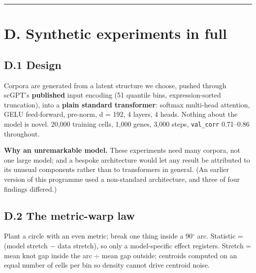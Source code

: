 \begin{center}\rule{0.5\linewidth}{0.5pt}\end{center}

\hypertarget{d.-synthetic-experiments-in-full}{%
\section{D. Synthetic experiments in full}\label{d.-synthetic-experiments-in-full}}

\hypertarget{d.1-design}{%
\subsection{D.1 Design}\label{d.1-design}}

Corpora are generated from a latent structure we choose, pushed through scGPT's \textbf{published} input
encoding (51 quantile bins, expression-sorted truncation), into a \textbf{plain standard transformer}:
softmax multi-head attention, GELU feed-forward, pre-norm, d = 192, 4 layers, 4 heads. Nothing about
the model is novel. 20,000 training cells, 1,000 genes, 3,000 steps, \texttt{val\_corr} 0.71--0.86 throughout.

\textbf{Why an unremarkable model.} These experiments need many corpora, not one large model;
and a bespoke architecture would let any result be attributed to its unusual components rather than to
transformers in general. (An earlier version of this programme used a non-standard architecture, and
three of four findings differed.)

\hypertarget{d.2-the-metric-warp-law}{%
\subsection{D.2 The metric-warp law}\label{d.2-the-metric-warp-law}}

Plant a circle with an even metric; break one thing inside a 90\(^{\circ}\) arc. Statistic = (model stretch \(-\) data
stretch), so only a model-specific effect registers. Stretch = mean knot gap inside the arc \(\div\) mean gap
outside; centroids computed on an equal number of cells per bin so density cannot drive centroid noise.

